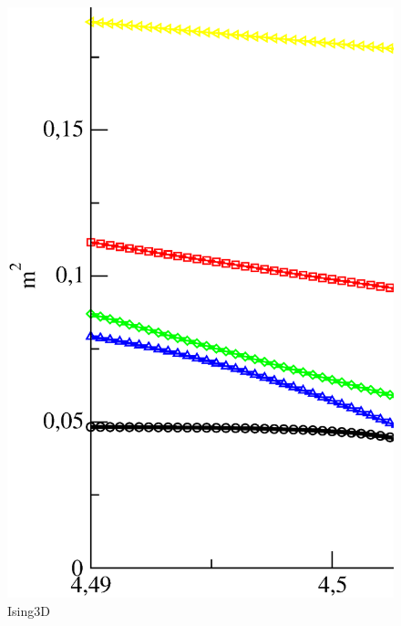\begin{figure}[!htpb]
  \centering
  \includegraphics[width=15cm]{./plots/Ising3D/Ising3D_M2_vs_Temperature.eps}
  \caption{Ising3D}
\end{figure}

